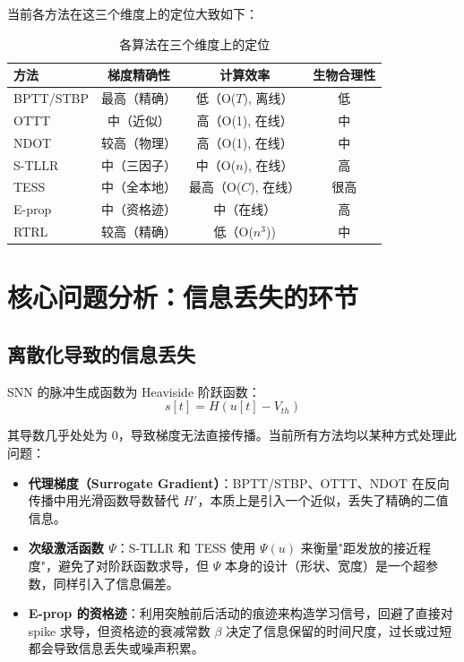 \documentclass[journal,12pt,onecolumn]{IEEEtran}
\begin{document}
当前各方法在这三个维度上的定位大致如下：

\begin{table}[h]
\centering
\caption{各算法在三个维度上的定位}
\begin{tabular}{lccc}
\toprule
\textbf{方法} & \textbf{梯度精确性} & \textbf{计算效率} & \textbf{生物合理性} \\
\midrule
BPTT/STBP    & 最高（精确）  & 低（O($T$), 离线） & 低 \\
OTTT         & 中（近似）    & 高（O(1), 在线）   & 中 \\
NDOT         & 较高（物理）  & 高（O(1), 在线）   & 中 \\
S-TLLR       & 中（三因子）  & 中（O($n$), 在线） & 高 \\
TESS         & 中（全本地）  & 最高（O($C$), 在线）& 很高 \\
E-prop       & 中（资格迹）  & 中（在线）         & 高 \\
RTRL         & 较高（精确）  & 低（O($n^3$))      & 中 \\
\bottomrule
\end{tabular}
\label{tab.positioning}
\end{table}

\section{核心问题分析：信息丢失的环节}

\subsection{离散化导致的信息丢失}

SNN 的脉冲生成函数为 Heaviside 阶跃函数：
\begin{equation}
s[t] = H(u[t] - V_{th})
\label{eq.heaviside}
\end{equation}

其导数几乎处处为 0，导致梯度无法直接传播。当前所有方法均以某种方式处理此问题：

\begin{itemize}
    \item \textbf{代理梯度（Surrogate Gradient）}：BPTT/STBP、OTTT、NDOT 在反向传播中用光滑函数导数替代 $H'$，本质上是引入一个近似，丢失了精确的二值信息。
    \item \textbf{次级激活函数 $\Psi$}：S-TLLR 和 TESS 使用 $\Psi(u)$ 来衡量"距发放的接近程度"，避免了对阶跃函数求导，但 $\Psi$ 本身的设计（形状、宽度）是一个超参数，同样引入了信息偏差。
    \item \textbf{E-prop 的资格迹}：利用突触前后活动的痕迹来构造学习信号，回避了直接对 spike 求导，但资格迹的衰减常数 $\beta$ 决定了信息保留的时间尺度，过长或过短都会导致信息丢失或噪声积累。
\end{itemize}
\end{document}
